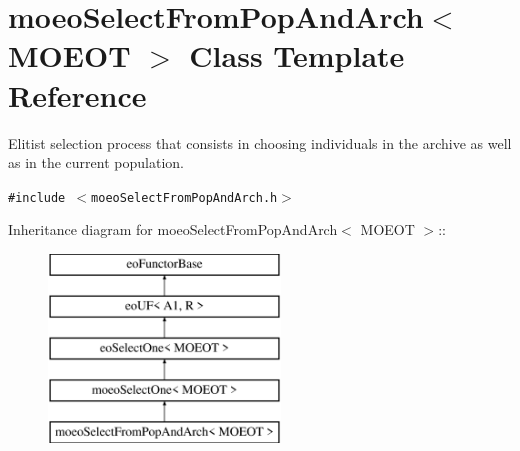 \section{moeo\-Select\-From\-Pop\-And\-Arch$<$ MOEOT $>$ Class Template Reference}
\label{classmoeoSelectFromPopAndArch}
Elitist selection process that consists in choosing individuals in the archive as well as in the current population.  


{\tt \#include $<$moeo\-Select\-From\-Pop\-And\-Arch.h$>$}

Inheritance diagram for moeo\-Select\-From\-Pop\-And\-Arch$<$ MOEOT $>$::\begin{figure}[H]
\begin{center}
\leavevmode
\includegraphics[height=5cm]{classmoeoSelectFromPopAndArch}
\end{center}
\end{figure}

